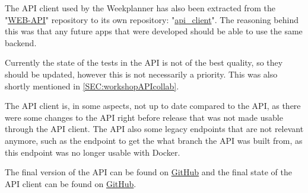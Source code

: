 The API client used by the Weekplanner has also been extracted from the "\href{https://github.com/aau-giraf/web-api/tree/2019S4R1}{WEB-API}" repository to its own repository: "\href{https://github.com/aau-giraf/api_client/tree/2019S4R1}{api\_client}".
The reasoning behind this was that any future apps that were developed should be able to use the same backend.

Currently the state of the tests in the API is not of the best quality, so they should be updated, however this is not necessarily a priority.
This was also shortly mentioned in \autoref{SEC:workshopAPIcollab}.

The API client is, in some aspects, not up to date compared to the API, as there were some changes to the API right before release that was not made usable through the API client.
The API also some legacy endpoints that are not relevant anymore, such as the endpoint to get the what branch the API was built from, as this endpoint was no longer usable with Docker.


The final version of the API can be found on \href{https://github.com/aau-giraf/web-api/tree/2019S4R1}{GitHub} and the final state of the API client can be found on \href{https://github.com/aau-giraf/api_client/tree/2019S4R1}{GitHub}.


